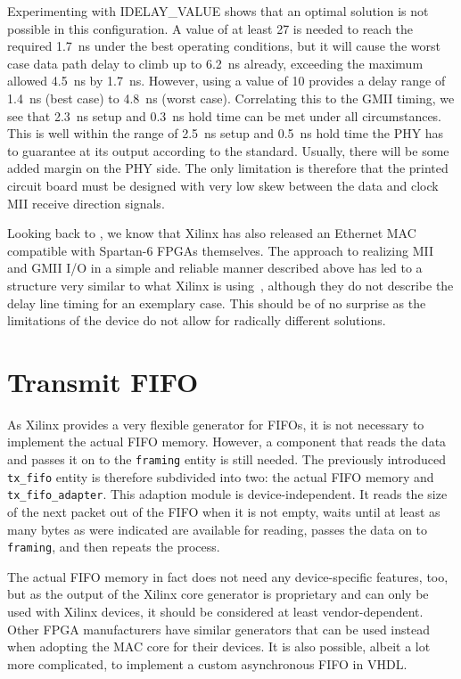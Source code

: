 \documentclass[a4paper, 11pt, oneside]{Thesis}  %
\begin{document}
Experimenting with IDELAY\_VALUE shows that an optimal solution is not possible in this configuration. A value of at least 27 is needed to reach the required 1.7~ns under the best operating conditions, but it will cause the worst case data path delay to climb up to 6.2~ns already, exceeding the maximum allowed 4.5~ns by 1.7~ns. However, using a value of 10 provides a delay range of 1.4~ns (best case) to 4.8~ns (worst case). Correlating this to the GMII timing, we see that 2.3~ns setup and 0.3~ns hold time can be met under all circumstances. This is well within the range of 2.5~ns setup and 0.5~ns hold time the PHY has to guarantee at its output according to the standard. Usually, there will be some added margin on the PHY side. The only limitation is therefore that the printed circuit board must be designed with very low skew between the data and clock MII receive direction signals.



Looking back to , we know that Xilinx has also released an Ethernet MAC compatible with Spartan-6 FPGAs themselves. The approach to realizing MII and GMII I/O in a simple and reliable manner described above has led to a structure very similar to what Xilinx is using~\cite{TEMAC}, although they do not describe the delay line timing for an exemplary case. This should be of no surprise as the limitations of the device do not allow for radically different solutions.

\section{Transmit FIFO}

As Xilinx provides a very flexible generator for FIFOs, it is not necessary to implement the actual FIFO memory. However, a component that reads the data and passes it on to the \texttt{framing} entity is still needed. The previously introduced \texttt{tx\_fifo} entity is therefore subdivided into two: the actual FIFO memory and \texttt{tx\_fifo\_adapter}. This adaption module is device-independent. It reads the size of the next packet out of the FIFO when it is not empty, waits until at least as many bytes as were indicated are available for reading, passes the data on to \texttt{framing}, and then repeats the process.

The actual FIFO memory in fact does not need any device-specific features, too, but as the output of the Xilinx core generator is proprietary and can only be used with Xilinx devices, it should be considered at least vendor-dependent. Other FPGA manufacturers have similar generators that can be used instead when adopting the MAC core for their devices. It is also possible, albeit a lot more complicated, to implement a custom asynchronous FIFO in VHDL.
\end{document}
